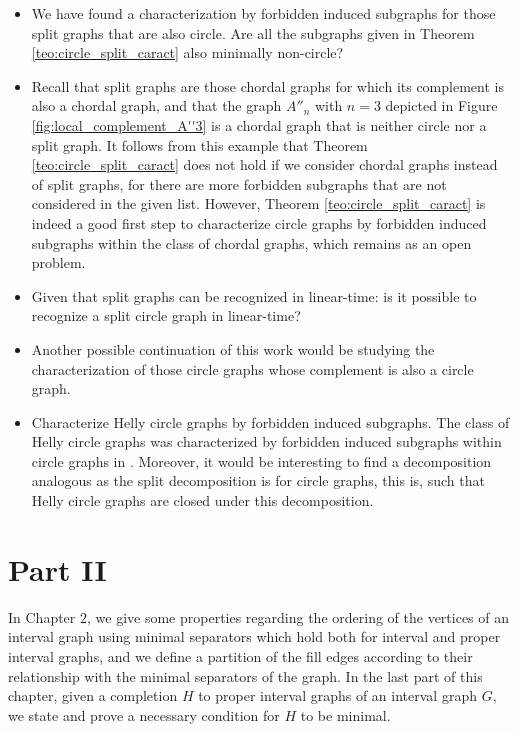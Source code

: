 \documentclass[12pt]{book}
\theoremstyle{plain}
\theoremstyle{remark}
\begin{document}
\begin{itemize}
\item We have found a characterization by forbidden induced subgraphs for those split graphs that are also circle. Are all the subgraphs given in Theorem \ref{teo:circle_split_caract} also minimally non-circle?

\item Recall that split graphs are those chordal graphs for which its complement is also a chordal graph, and that the graph $A''_n$ with $n = 3$ depicted in Figure \ref{fig:local_complement_A''3} is a chordal graph that is neither circle nor a split graph. It follows from this example that Theorem \ref{teo:circle_split_caract} does not hold if we consider chordal graphs instead of split graphs, for there are more forbidden subgraphs that are not considered in the given list. However, Theorem \ref{teo:circle_split_caract} is indeed a good first step to characterize circle graphs by forbidden induced subgraphs within the class of chordal graphs, which remains as an open problem.

\item Given that split graphs can be recognized in linear-time: is it possible to recognize a split circle graph in linear-time?

\item Another possible continuation of this work would be studying the characterization of those circle graphs whose complement is also a circle graph.  

\item Characterize Helly circle graphs by forbidden induced subgraphs. The class of Helly circle graphs was characterized by forbidden induced subgraphs within circle graphs in \cite{DGR10}.
Moreover, it would be interesting to find a decomposition analogous as the split decomposition is for circle graphs, this is, such that Helly circle graphs are closed under this decomposition.
\end{itemize}

\section*{Part II}

In Chapter $2$, we give some properties regarding the ordering of the vertices of an interval graph using minimal separators which hold both for interval and proper interval graphs, and we define a partition of the fill edges according to their relationship with the minimal separators of the graph. In the last part of this chapter, given a completion $H$ to proper interval graphs of an interval graph $G$, we state and prove a necessary condition for $H$ to be minimal.
\end{document}
